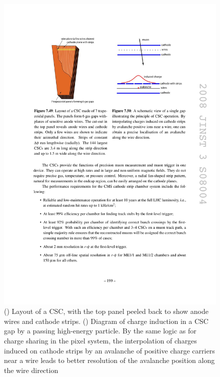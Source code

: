 \begin{figure}[hbtp]
  \begin{center}
    \includegraphics[width=1.24\cmsFigWidth]{figures/cms-muon-CSCcell}
    \caption{(\cmsLeft) Layout of a CSC, with the top panel peeled back to show anode wires and cathode strips. (\cmsRight) Diagram of charge induction in a CSC gap by a passing high-energy particle. By the same logic as for charge sharing in the pixel system, the interpolation of charges induced on cathode strips by an avalanche of positive charge carriers near a wire leads to better resolution of the avalanche position along the wire direction~\cite{1748-0221-3-08-S08004}}
    \label{fig:cms-muon-CSCcell}
  \end{center}
\end{figure}

